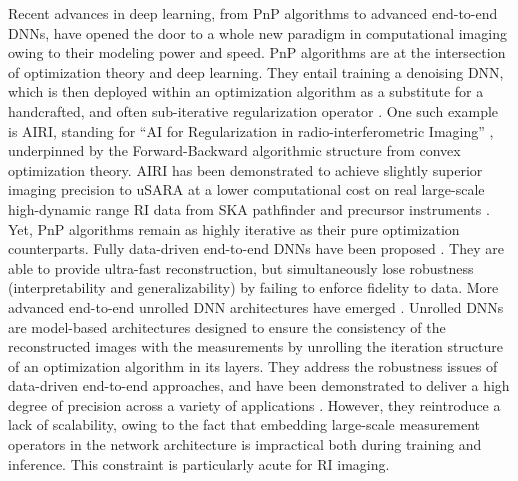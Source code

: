 \documentclass[preprint2,twocolumn]{aastex631}
\begin{document}
Recent advances in deep learning, from PnP algorithms to advanced end-to-end DNNs, have opened the door to a whole new paradigm in computational imaging owing to their modeling power and speed. PnP algorithms are at the intersection of optimization theory and deep learning. They entail training a denoising DNN, which is then deployed within an optimization algorithm as a substitute for a handcrafted, and often sub-iterative regularization operator \citep{venkatakrishnan2013,Chan2017,Zhang2017,Kamilov23}. One such example is AIRI, standing for ``AI for Regularization in radio-interferometric Imaging'' \citep{terris2022}, underpinned by the Forward-Backward algorithmic structure from convex optimization theory. AIRI has been demonstrated to achieve slightly superior imaging precision to uSARA at a lower computational cost on real large-scale high-dynamic range RI data from SKA pathfinder and precursor instruments \citep{dabbech2022,wilber23b}. 
Yet, PnP algorithms remain as highly iterative as their pure optimization counterparts. Fully data-driven end-to-end DNNs have been proposed \citep{connor2022deep}. They are able to provide ultra-fast reconstruction, but simultaneously lose robustness (interpretability and generalizability) by failing to enforce fidelity to data. More advanced end-to-end unrolled DNN architectures have emerged \citep[see][and references within]{Monga21}. Unrolled DNNs are model-based architectures designed to ensure the consistency of the reconstructed images with the measurements by unrolling the iteration structure of an optimization algorithm in its layers. They address the robustness issues of data-driven end-to-end approaches, and have been demonstrated to deliver a high degree of precision across a variety of applications \citep{Kamilov23}. However, they reintroduce a lack of scalability, owing to the fact that embedding large-scale measurement operators in the network architecture is impractical both during training and inference. This constraint is particularly acute for RI imaging. 
\end{document}
